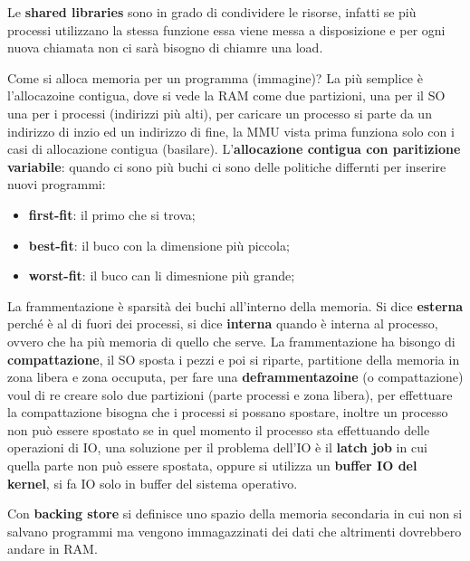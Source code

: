 \documentclass[12pt]{article}
\begin{document}
Le \textbf{shared libraries} sono in grado di condividere le risorse, infatti se pi\`u processi utilizzano la stessa funzione essa viene messa a disposizione e per ogni nuova chiamata non ci sar\`a bisogno di chiamre una load.


Come si alloca memoria per un programma (immagine)? La pi\`u semplice \`e l'allocazoine contigua, dove si vede la RAM come due partizioni, una per il SO una per i processi (indirizzi pi\`u alti), per caricare un processo si parte da un indirizzo di inzio ed un indirizzo di fine, la MMU vista prima funziona solo con i casi di allocazione contigua (basilare). L'\textbf{allocazione contigua con paritizione variabile}: quando ci sono pi\`u buchi ci sono delle politiche differnti per inserire nuovi programmi:
\begin{itemize}
  \item \textbf{first-fit}: il primo che si trova;
  \item \textbf{best-fit}: il buco con la dimensione pi\`u piccola;
  \item \textbf{worst-fit}: il buco can li dimesnione pi\`u grande;
\end{itemize}
La frammentazione \`e sparsit\`a dei buchi all'interno della memoria. Si dice \textbf{esterna} perch\'e \`e al di fuori dei processi, si dice \textbf{interna} quando \`e interna al processo, ovvero che ha pi\`u memoria di quello che serve. La frammentazione ha bisongo di \textbf{compattazione}, il SO sposta i pezzi e poi si riparte, partitione della memoria in zona libera e zona occuputa, per fare una \textbf{deframmentazoine} (o compattazione) voul di re creare solo due partizioni (parte processi e zona libera), per effettuare la compattazione bisogna che i processi si possano spostare, inoltre un processo non pu\`o essere spostato se in quel momento il processo sta effettuando delle operazioni di IO, una soluzione per il problema dell'IO \`e il \textbf{latch job} in cui quella parte non pu\`o essere spostata, oppure si utilizza un \textbf{buffer IO del kernel}, si fa IO solo in buffer del sistema operativo.

Con \textbf{backing store} si definisce uno spazio della memoria secondaria in cui non si salvano programmi ma vengono immagazzinati dei dati che altrimenti dovrebbero andare in RAM.
\end{document}
